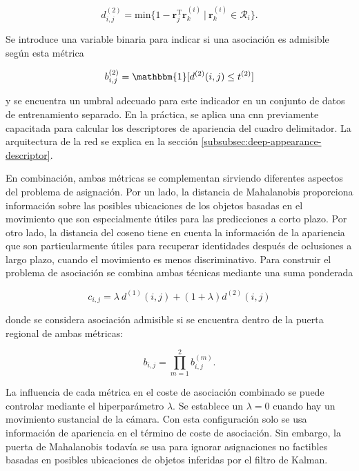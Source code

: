 \begin{equation}
\label{eq:equation3-deepsort}
d_{i,j}^{(2)} = \text{min} \{1 - \boldsymbol{r}_{j}^{\text{T}} \boldsymbol{r}_{k}^{(i)} \ | \ \boldsymbol{r}_{k}^{(i)} \in \mathcal{R}_{i} \}.
\end{equation}

Se introduce una variable binaria para indicar si una asociación es admisible según esta métrica

\begin{equation}
\label{eq:equation4-deepsort}
b_{i,j}^{(2)} = \mathbbm{1}[d^{(2)} (i,j) \leq t^{(2)}]
\end{equation}

y se encuentra un umbral adecuado para este indicador en un conjunto de datos de entrenamiento separado. En la práctica, se aplica una \gls{cnn} previamente capacitada para calcular los descriptores de apariencia del cuadro delimitador. La arquitectura de la red se explica en la sección \ref{subsubsec:deep-appearance-descriptor}.

En combinación, ambas métricas se complementan sirviendo diferentes aspectos del problema de asignación. Por un lado, la distancia de Mahalanobis proporciona información sobre las posibles ubicaciones de los objetos basadas en el movimiento que son especialmente útiles para las predicciones a corto plazo. Por otro lado, la distancia del coseno tiene en cuenta la información de la apariencia que son particularmente útiles para recuperar identidades después de oclusiones a largo plazo, cuando el movimiento es menos discriminativo. Para construir el problema de asociación se combina ambas técnicas mediante una suma ponderada

\begin{equation}
\label{eq:equation5-deepsort}
c_{i,j} = \lambda \ d^{(1)}(i,j) + (1 + \lambda)d^{(2)}(i,j)
\end{equation}

donde se considera asociación admisible si se encuentra dentro de la puerta regional de ambas métricas:

\begin{equation}
\label{eq:equation6-deepsort}
b_{i,j} = \prod_{m=1}^{2} b_{i,j}^{(m)}.
\end{equation}

La influencia de cada métrica en el coste de asociación combinado se puede controlar mediante el hiperparámetro $\lambda$. Se establece un $\lambda = 0$ cuando hay un movimiento sustancial de la cámara. Con esta configuración solo se usa información de apariencia en el término de coste de asociación. Sin embargo, la puerta de Mahalanobis todavía se usa para ignorar asignaciones no factibles basadas en posibles ubicaciones de objetos inferidas por el filtro de Kalman.

